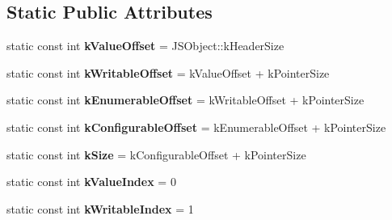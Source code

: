 \subsection*{Static Public Attributes}
\begin{DoxyCompactItemize}
\item 
static const int {\bfseries k\+Value\+Offset} = J\+S\+Object\+::k\+Header\+Size\hypertarget{classv8_1_1internal_1_1_j_s_data_property_descriptor_a6884763d4a5c2789b65db05de495ec78}{}\label{classv8_1_1internal_1_1_j_s_data_property_descriptor_a6884763d4a5c2789b65db05de495ec78}

\item 
static const int {\bfseries k\+Writable\+Offset} = k\+Value\+Offset + k\+Pointer\+Size\hypertarget{classv8_1_1internal_1_1_j_s_data_property_descriptor_aeee347bbad1434ac245775a692c69dbb}{}\label{classv8_1_1internal_1_1_j_s_data_property_descriptor_aeee347bbad1434ac245775a692c69dbb}

\item 
static const int {\bfseries k\+Enumerable\+Offset} = k\+Writable\+Offset + k\+Pointer\+Size\hypertarget{classv8_1_1internal_1_1_j_s_data_property_descriptor_ad91a34ea161422daa3173abb1601d1c5}{}\label{classv8_1_1internal_1_1_j_s_data_property_descriptor_ad91a34ea161422daa3173abb1601d1c5}

\item 
static const int {\bfseries k\+Configurable\+Offset} = k\+Enumerable\+Offset + k\+Pointer\+Size\hypertarget{classv8_1_1internal_1_1_j_s_data_property_descriptor_a1f3a3bdad8ac99364898f01b2d23db85}{}\label{classv8_1_1internal_1_1_j_s_data_property_descriptor_a1f3a3bdad8ac99364898f01b2d23db85}

\item 
static const int {\bfseries k\+Size} = k\+Configurable\+Offset + k\+Pointer\+Size\hypertarget{classv8_1_1internal_1_1_j_s_data_property_descriptor_a37d3ebd512c7f6040eca3be6519bf825}{}\label{classv8_1_1internal_1_1_j_s_data_property_descriptor_a37d3ebd512c7f6040eca3be6519bf825}

\item 
static const int {\bfseries k\+Value\+Index} = 0\hypertarget{classv8_1_1internal_1_1_j_s_data_property_descriptor_a4166d6de9d203399e1517c727287060b}{}\label{classv8_1_1internal_1_1_j_s_data_property_descriptor_a4166d6de9d203399e1517c727287060b}

\item 
static const int {\bfseries k\+Writable\+Index} = 1\hypertarget{classv8_1_1internal_1_1_j_s_data_property_descriptor_a446bf010d5d4bb2fc786efa1a1e66f8a}{}\label{classv8_1_1internal_1_1_j_s_data_property_descriptor_a446bf010d5d4bb2fc786efa1a1e66f8a}


\end{DoxyCompactItemize}
